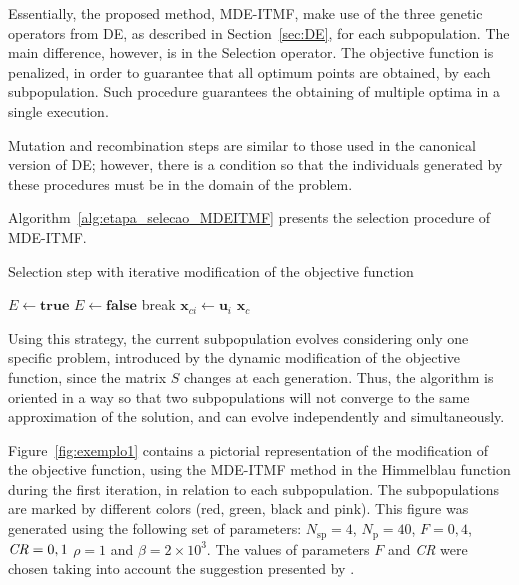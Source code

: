 \documentclass[smallextended]{svjour3}       %
\begin{document}
Essentially, the proposed method, MDE-ITMF, make use of the three genetic operators from DE, as described in Section~\ref{sec:DE}, for each subpopulation. The main difference, however, is in the Selection operator. The objective function is penalized, in order to guarantee that all optimum points are obtained, by each subpopulation. Such procedure guarantees the obtaining of multiple optima in a single execution.

Mutation and recombination steps are similar to those used in the canonical version of DE; however, there is a condition so that the individuals generated by these procedures must be in the domain of the problem.

Algorithm~\ref{alg:etapa_selecao_MDEITMF} presents the selection procedure of MDE-ITMF.

\begin{algorithm}[!htb]
\caption{Selection step with iterative modification of the objective function}\label{alg:etapa_selecao_MDEITMF}
\begin{algorithmic}[1]
\State $ E \leftarrow \textbf{true} $
\State $ E \leftarrow \textbf{false} $
\State break
\EndIf
\EndFor
{}
\State $ \boldsymbol{x}_{ci} \leftarrow \boldsymbol{u}_{i} $
\EndIf
\EndIf
\EndFor
\State \Return $ \boldsymbol{x}_{c} $
\EndFunction
\end{algorithmic}
\end{algorithm}

Using this strategy, the current subpopulation evolves considering only one specific problem, introduced by the dynamic modification of the objective function, since the matrix $S$ changes at each generation. Thus, the algorithm is oriented in a way so that two subpopulations will not converge to the same approximation of the solution, and can evolve independently and simultaneously.

Figure~\ref{fig:exemplo1} contains a pictorial representation of the modification of the objective function, using the MDE-ITMF method in the Himmelblau function during the first iteration, in relation to each subpopulation. The subpopulations are marked by different colors (red, green, black and pink). This figure was generated using the following set of parameters: $N_{\text{sp}} = 4$, $N_{\text{p}} = 40$, $F = 0,4$, $\emph{CR} = 0,1$ $\rho = 1$ and $\beta = 2 \times 10^{3}$. The values of parameters $F$ and \emph{CR} were chosen taking into account the suggestion presented by \cite{bib:storn1997differential}.
\end{document}

